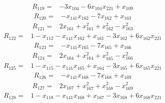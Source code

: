\begin{equation*}\begin{split}
R_{119}={}&-3x_{104} - 6x_{104} x_{221} + x_{109}
\end{split}\end{equation*}
\begin{equation*}\begin{split}
R_{120}={}&-x_{141} x_{162} - 7x_{162} + x_{163}
\end{split}\end{equation*}
\begin{equation*}\begin{split}
R_{121}={}&2x_{161} + x_{161}^{2} + x_{162}^{2} - x_{163}^{2}
\end{split}\end{equation*}
\begin{equation*}\begin{split}
R_{122}={}&1 - x_{112} - x_{141} x_{162} + x_{161} - 3x_{162} + 6x_{162} x_{221}
\end{split}\end{equation*}
\begin{equation*}\begin{split}
R_{123}={}&-x_{141} x_{165} - 7x_{165} + x_{166}
\end{split}\end{equation*}
\begin{equation*}\begin{split}
R_{124}={}&2x_{164} + x_{164}^{2} + x_{165}^{2} - x_{166}^{2}
\end{split}\end{equation*}
\begin{equation*}\begin{split}
R_{125}={}&1 - x_{115} - x_{141} x_{165} + x_{164} - 3x_{165} + 6x_{165} x_{221}
\end{split}\end{equation*}
\begin{equation*}\begin{split}
R_{126}={}&-x_{141} x_{168} - 7x_{168} + x_{169}
\end{split}\end{equation*}
\begin{equation*}\begin{split}
R_{127}={}&2x_{167} + x_{167}^{2} + x_{168}^{2} - x_{169}^{2}
\end{split}\end{equation*}
\begin{equation*}\begin{split}
R_{128}={}&1 - x_{118} - x_{141} x_{168} + x_{167} - 3x_{168} + 6x_{168} x_{221}
\end{split}\end{equation*}
